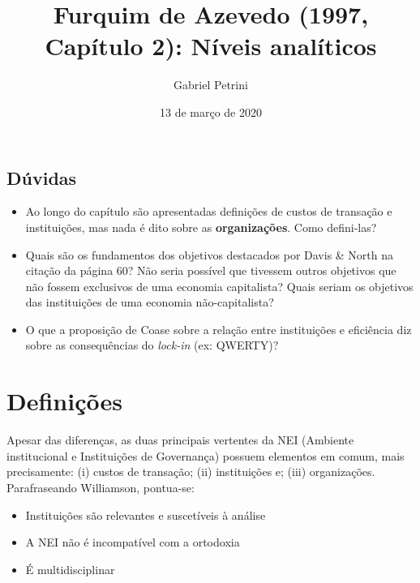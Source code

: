 \documentclass[9pt,twocolumn,twoside,lineno]{style}
\title{Furquim de Azevedo (1997, Capítulo 2): Níveis analíticos}
\date{13 de março de 2020}
\author[$\ddagger$]{Gabriel Petrini}
\affil[$\ddagger$]{Doutorando no instituto de Economia da Unicamp}
\begin{document}
\maketitle
\articletypemark
\marginmark
\thispagestyle{firststyle}


\begin{duvidas}
	\sffamily
	{%
		\begin{mdframed}[style=stylesigstyle]%
			\section*{Dúvidas}%
			\begin{itemize}
				\item Ao longo do capítulo são apresentadas definições de custos de transação e instituições, mas nada é dito sobre as \textbf{organizações}. Como defini-las?
				\item Quais são os fundamentos dos objetivos destacados por Davis \&
				North na citação da página 60? Não seria possível que tivessem outros objetivos que não fossem exclusivos de uma economia capitalista? Quais seriam os objetivos das instituições de uma economia não-capitalista?
				\item O que a proposição de Coase sobre a relação entre instituições e eficiência diz sobre as consequências do \textit{lock-in} (ex: QWERTY)?
			\end{itemize}
	\end{mdframed}}
\end{duvidas}



\section{Definições}
	
Apesar das diferenças, as duas principais vertentes da NEI (Ambiente institucional e Instituições de Governança) possuem elementos em comum, mais precisamente: (i) custos de transação; (ii) instituições e; (iii) organizações. Parafraseando Williamson, pontua-se:

\begin{itemize}
	\item Instituições são relevantes e suscetíveis à análise
	\item A NEI não é incompatível com a ortodoxia
	\item É multidisciplinar
\end{itemize}
\end{document}
